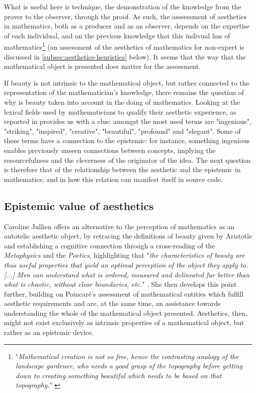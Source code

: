 What is useful here is technique, the demonstration of the knowledge from the prover to the observer, through the proof. As such, the asssessment of aesthetics in mathematics, both as a producer and as an observer, depends on the expertise of each individual, and on the previous knowledge that this indivual has of mathematics\footnote{"\emph{Mathematical creation is not so free, hence the contrasting analogy of the landscape gardener, who needs a good grasp of the topography before getting down to creating something beautiful which needs to be based on that topography.}" \citep{thomas_beauty_2017}} (an assessment of the aesthetics of mathematics for non-expert is discussed in \autoref{subsec:aesthetics-heuristics} below). It seems that the way that the mathematical object is presented does matter for the assessment.

If beauty is not intrinsic to the mathematical object, but rather connected to the representation of the mathematician's knowledge, there remains the question of why is beauty taken into account in the doing of mathematics. Looking at the lexical fields used by mathematicians to qualify their aesthetic experience, as reported in \citep{inglis_beauty_2015} provides us with a clue: amongst the most used terms are "ingenious", "striking", "inspired", "creative", "beautiful", "profound" and "elegant". Some of these terms have a connection to the epistemic: for instance, something ingenious enables previously unseen connections between concepts, implying the resourcefulness and the cleverness of the originator of the idea. The next question is therefore that of the relationship between the aesthetic and the epistemic in mathematics; and in how this relation can manifest itself in source code.

\subsection{Epistemic value of aesthetics}
\label{subsec:epistemic-aesthetics}

Caroline Jullien offers an alternative to the perception of mathematics as an autotelic aesthetic object, by retracing the definitions of beauty given by Aristotle and establishing a cognitive connection through a cross-reading of the \emph{Metaphysics} and the \emph{Poetics}, highlighting that "\emph{the characteristics of beauty are thus useful properties that yield an optimal perception of the object they apply to. [...] Men can understand what is ordered, measured and delineated far better than what is chaotic, without clear boundaries, etc.}" \citep{jullien_languages_2012}. She then develops this point further, building on Poincaré's assessment of mathematical entities which fulfill aesthetic requirements and are, at the same time, an assistance towards understanding the whole of the mathematical object presented. Aesthetics, then, might not exist exclusively as intrinsic properties of a mathematical object, but rather as an epistemic device.

